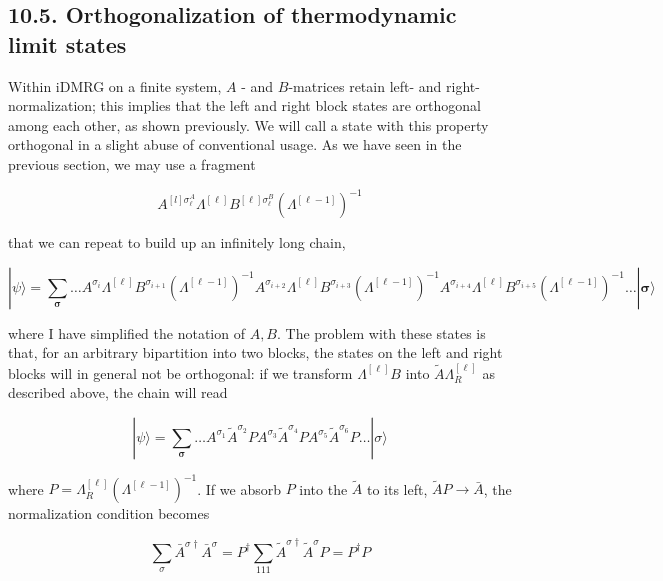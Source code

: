 \documentclass[12pt]{article}
\begin{document}
\subsection*{10.5. Orthogonalization of thermodynamic limit states}
Within iDMRG on a finite system, $A$ - and $B$-matrices retain left- and right-normalization; this implies that the left and right block states are orthogonal among each other, as shown previously. We will call a state with this property orthogonal in a slight abuse of conventional usage. As we have seen in the previous section, we may use a fragment


\begin{equation*}
A^{[l] \sigma_{\ell}^{A}} \Lambda^{[\ell]} B^{[\ell] \sigma_{\ell}^{B}}\left(\Lambda^{[\ell-1]}\right)^{-1} \tag{349}
\end{equation*}


that we can repeat to build up an infinitely long chain,


\begin{equation*}
|\psi\rangle=\sum_{\boldsymbol{\sigma}} \ldots A^{\sigma_{i}} \Lambda^{[\ell]} B^{\sigma_{i+1}}\left(\Lambda^{[\ell-1]}\right)^{-1} A^{\sigma_{i+2}} \Lambda^{[\ell]} B^{\sigma_{i+3}}\left(\Lambda^{[\ell-1]}\right)^{-1} A^{\sigma_{i+4}} \Lambda^{[\ell]} B^{\sigma_{i+5}}\left(\Lambda^{[\ell-1]}\right)^{-1} \ldots|\boldsymbol{\sigma}\rangle \tag{350}
\end{equation*}


where I have simplified the notation of $A, B$. The problem with these states is that, for an arbitrary bipartition into two blocks, the states on the left and right blocks will in general not be orthogonal: if we transform $\Lambda^{[\ell]} B$ into $\tilde{A} \Lambda_{R}^{[\ell]}$ as described above, the chain will read


\begin{equation*}
|\psi\rangle=\sum_{\boldsymbol{\sigma}} \ldots A^{\sigma_{1}} \tilde{A}^{\sigma_{2}} P A^{\sigma_{3}} \tilde{A}^{\sigma_{4}} P A^{\sigma_{5}} \tilde{A}^{\sigma_{6}} P \ldots|\sigma\rangle \tag{351}
\end{equation*}


where $P=\Lambda_{R}^{[\ell]}\left(\Lambda^{[\ell-1]}\right)^{-1}$. If we absorb $P$ into the $\tilde{A}$ to its left, $\tilde{A} P \rightarrow \bar{A}$, the normalization condition becomes


\begin{equation*}
\sum_{\sigma} \bar{A}^{\sigma \dagger} \bar{A}^{\sigma}=P^{\dagger} \sum_{111} \tilde{A}^{\sigma \dagger} \tilde{A}^{\sigma} P=P^{\dagger} P \tag{352}
\end{equation*}
\end{document}
